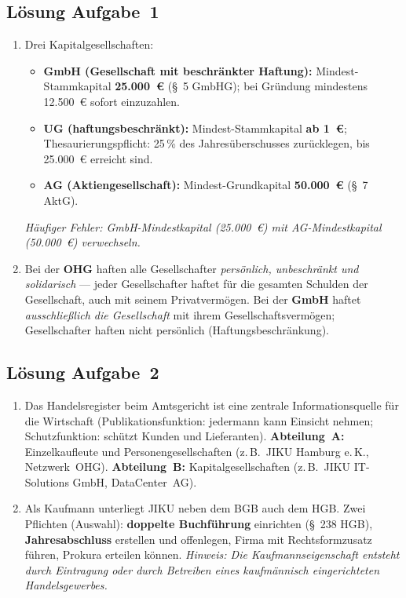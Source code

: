 \documentclass[11pt, a4paper]{article}
\begin{document}
\subsection*{Lösung Aufgabe~1}

\begin{enumerate}[label=(\alph*)]
  \item Drei Kapitalgesellschaften:
  \begin{itemize}
    \item \textbf{GmbH (Gesellschaft mit beschränkter Haftung):} Mindest-Stammkapital
    \textbf{25.000~€} (§~5 GmbHG); bei Gründung mindestens 12.500~€ sofort einzuzahlen.
    \item \textbf{UG (haftungsbeschränkt):} Mindest-Stammkapital \textbf{ab 1~€}; Thesaurierungspflicht:
    25\,\% des Jahresüberschusses zurücklegen, bis 25.000~€ erreicht sind.
    \item \textbf{AG (Aktiengesellschaft):} Mindest-Grundkapital \textbf{50.000~€} (§~7 AktG).
  \end{itemize}
  \textit{Häufiger Fehler: GmbH-Mindestkapital (25.000~€) mit AG-Mindestkapital (50.000~€) verwechseln.}

  \item Bei der \textbf{OHG} haften alle Gesellschafter \emph{persönlich, unbeschränkt und solidarisch}
  --- jeder Gesellschafter haftet für die gesamten Schulden der Gesellschaft, auch mit seinem
  Privatvermögen. Bei der \textbf{GmbH} haftet \emph{ausschließlich die Gesellschaft} mit ihrem
  Gesellschaftsvermögen; Gesellschafter haften nicht persönlich (Haftungsbeschränkung).
\end{enumerate}

\subsection*{Lösung Aufgabe~2}

\begin{enumerate}[label=(\alph*)]
  \item Das Handelsregister beim Amtsgericht ist eine zentrale Informationsquelle für die Wirtschaft
  (Publikationsfunktion: jedermann kann Einsicht nehmen; Schutzfunktion: schützt Kunden und Lieferanten).
  \textbf{Abteilung~A:} Einzelkaufleute und Personengesellschaften (z.\,B.\ JIKU Hamburg e.\,K.,
  Netzwerk~OHG). \textbf{Abteilung~B:} Kapitalgesellschaften (z.\,B.\ JIKU IT-Solutions GmbH, DataCenter~AG).

  \item Als Kaufmann unterliegt JIKU neben dem BGB auch dem HGB. Zwei Pflichten (Auswahl):
  \textbf{doppelte Buchführung} einrichten (§~238 HGB), \textbf{Jahresabschluss} erstellen und
  offenlegen, Firma mit Rechtsformzusatz führen, Prokura erteilen können.
  \textit{Hinweis: Die Kaufmannseigenschaft entsteht durch Eintragung oder durch Betreiben eines
  kaufmännisch eingerichteten Handelsgewerbes.}
\end{enumerate}
\end{document}
